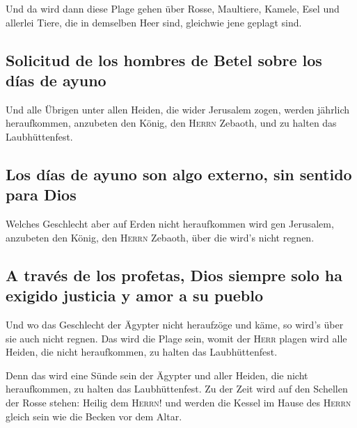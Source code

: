  Und da wird dann diese Plage gehen über Rosse,
Maultiere, Kamele, Esel und allerlei Tiere, die in demselben Heer sind,
gleichwie jene geplagt sind.

\hypertarget{solicitud-de-los-hombres-de-betel-sobre-los-duxedas-de-ayuno}{%
\subsection{Solicitud de los hombres de Betel sobre los días de
ayuno}\label{solicitud-de-los-hombres-de-betel-sobre-los-duxedas-de-ayuno}}

 Und alle Übrigen unter allen Heiden, die wider Jerusalem
zogen, werden jährlich heraufkommen, anzubeten den König, den
\textsc{Herrn} Zebaoth, und zu halten das Laubhüttenfest.

\hypertarget{los-duxedas-de-ayuno-son-algo-externo-sin-sentido-para-dios}{%
\subsection{Los días de ayuno son algo externo, sin sentido para
Dios}\label{los-duxedas-de-ayuno-son-algo-externo-sin-sentido-para-dios}}

 Welches Geschlecht aber auf Erden nicht heraufkommen
wird gen Jerusalem, anzubeten den König, den \textsc{Herrn} Zebaoth,
über die wird's nicht regnen.

\hypertarget{a-travuxe9s-de-los-profetas-dios-siempre-solo-ha-exigido-justicia-y-amor-a-su-pueblo}{%
\subsection{A través de los profetas, Dios siempre solo ha exigido
justicia y amor a su
pueblo}\label{a-travuxe9s-de-los-profetas-dios-siempre-solo-ha-exigido-justicia-y-amor-a-su-pueblo}}

 Und wo das Geschlecht der Ägypter nicht heraufzöge und
käme, so wird's über sie auch nicht regnen. Das wird die Plage sein,
womit der \textsc{Herr} plagen wird alle Heiden, die nicht heraufkommen,
zu halten das Laubhüttenfest.

 Denn das wird eine Sünde sein der Ägypter und aller
Heiden, die nicht heraufkommen, zu halten das Laubhüttenfest.
 Zu der Zeit wird auf den Schellen der Rosse stehen:
Heilig dem \textsc{Herrn}! und werden die Kessel im Hause des
\textsc{Herrn} gleich sein wie die Becken vor dem Altar.

